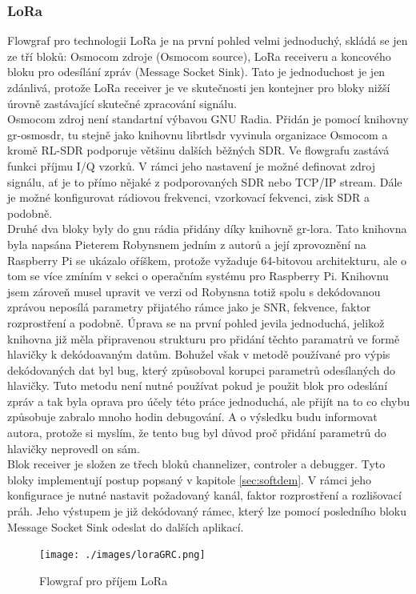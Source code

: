 \documentclass{ctuthesis}
\begin{document}
\subsubsection{LoRa}
Flowgraf pro technologii LoRa je na první pohled velmi jednoduchý, skládá se jen ze tří bloků: Osmocom zdroje (Osmocom source), LoRa receiveru a koncového bloku pro odesílání zpráv (Message Socket Sink). Tato je jednoduchost je jen zdánlivá, protože LoRa receiver je ve skutečnosti jen kontejner pro bloky nižší úrovně zastávající skutečné zpracování signálu. \\
Osmocom zdroj není standartní výbavou GNU Radia. Přidán je pomocí knihovny gr-osmosdr, tu stejně jako knihovnu librtlsdr vyvinula organizace Osmocom a kromě RL-SDR podporuje většinu dalších běžných SDR. Ve flowgrafu zastává funkci příjmu I/Q vzorků. V rámci jeho nastavení je možné definovat zdroj signálu, ať je to přímo nějaké z podporovaných SDR nebo TCP/IP stream. Dále je možné konfigurovat rádiovou frekvenci, vzorkovací fekvenci, zisk SDR a podobně. \\
Druhé dva bloky byly do gnu rádia přidány díky knihovně gr-lora. Tato knihovna byla napsána Pieterem Robynsnem jedním z autorů \cite{gr-lora2018} a její zprovoznění na Raspberry Pi se ukázalo oříškem, protože vyžaduje 64-bitovou architekturu, ale o tom se více zmíním v sekci o operačním systému pro Raspberry Pi. Knihovnu jsem zároveň musel upravit ve verzi od Robynsna totiž spolu s dekódovanou zprávou neposílá parametry přijatého rámce jako je SNR, fekvence, faktor rozprostření a podobně. Úprava se na první pohled jevila jednoduchá, jelikož knihovna již měla připravenou strukturu pro přidání těchto paramatrů ve formě hlavičky k dekódoavaným datům. Bohužel však v metodě používané pro výpis dekódovaných dat byl bug, který způsoboval korupci parametrů odesílaných do hlavičky. Tuto metodu není nutné používat pokud je použit blok pro odeslání zpráv a tak byla oprava pro účely této práce jednoduchá, ale přijít na to co chybu způsobuje zabralo mnoho hodin debugování. A o výsledku budu informovat autora, protože si myslím, že tento bug byl důvod proč přidání parametrů do hlavičky neprovedl on sám.\\
Blok receiver je složen ze třech bloků channelizer, controler a debugger. Tyto bloky implementují postup popsaný v kapitole \ref{sec:softdem}. V rámci jeho konfigurace je nutné nastavit požadovaný kanál, faktor rozprostření a rozlišovací práh. Jeho výstupem je již dekódovaný rámec, který lze pomocí posledního bloku Message Socket Sink odeslat do dalších aplikací.
\begin{figure}
\caption{Flowgraf pro příjem LoRa}
\texttt{[image: ./images/loraGRC.png]}
\label{loraGRC}
\end{figure}
\end{document}
